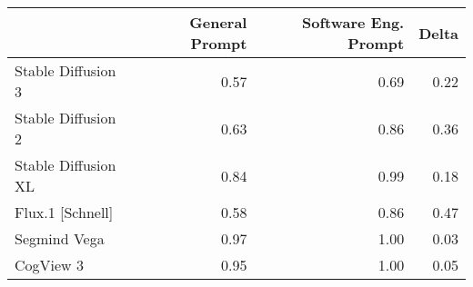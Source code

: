 \begin{tabular}{lrrr}
\toprule
 & General Prompt & Software Eng. Prompt & Delta \\
\midrule
Stable Diffusion 3 & 0.57 & 0.69 & 0.22 \\
Stable Diffusion 2 & 0.63 & 0.86 & 0.36 \\
Stable Diffusion XL & 0.84 & 0.99 & 0.18 \\
Flux.1 [Schnell] & 0.58 & 0.86 & 0.47 \\
Segmind Vega & 0.97 & 1.00 & 0.03 \\
CogView 3 & 0.95 & 1.00 & 0.05 \\
\bottomrule
\end{tabular}
